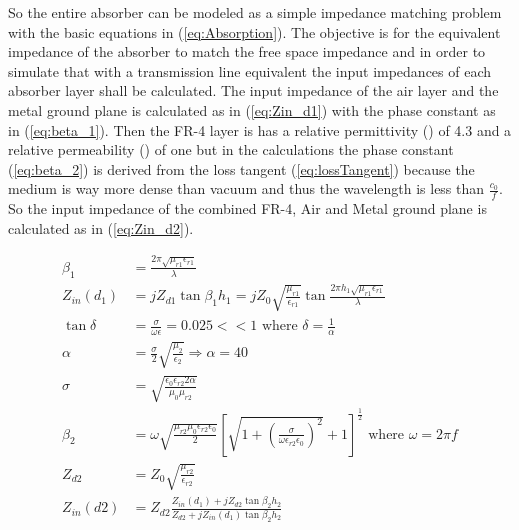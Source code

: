             So the entire absorber can be modeled as a simple impedance matching
            problem with the basic equations in (\ref{eq:Absorption}). The
            objective is for the equivalent impedance of the absorber to match
            the free space impedance and in order to simulate that with a 
            transmission line equivalent the input impedances of each absorber
            layer shall be calculated. The input impedance of the air layer and
            the metal ground plane is calculated as in (\ref{eq:Zin_d1}) with
            the phase constant as in (\ref{eq:beta_1}). Then the FR-4 layer
            is has a relative permittivity (\epsilon) of 4.3 and a relative 
            permeability (\mu) of one but in the calculations the phase
            constant (\ref{eq:beta_2}) is derived from the loss tangent 
            (\ref{eq:lossTangent}) because the medium is way more dense than
            vacuum and thus the wavelength is less than $\frac{c_0}{f}$. So the 
            input impedance of the combined FR-4, Air and Metal ground plane is 
            calculated as in (\ref{eq:Zin_d2}).

            \begin{subequations}
                \label{eq:Zin}
                \begin{align}
                    \beta_1 & = \frac{2\pi\sqrt{\mu_{r1}\epsilon_{r1}}}{\lambda} \label{eq:beta_1} \\
                    Z_{in}(d_1) & = jZ_{d1}\tan{\beta_1h_1} = jZ_0\sqrt{\frac{\mu_{r1}}{\epsilon_{r1}}}
                            \tan{\frac{2\pi h_1\sqrt{\mu_{r1}\epsilon_{r1}}}{\lambda}} \label{eq:Zin_d1} \\
                    \tan{\delta} & = \frac{\sigma}{\omega\epsilon} = 0.025 << 1
                        \textrm{ where } \delta = \frac{1}{\alpha} \label{eq:lossTangent} \\
                    \alpha & = \frac{\sigma}{2}\sqrt{\frac{\mu_2}{\epsilon_2}} \Rightarrow \alpha = 40 \label{eq:alpha} \\
                    \sigma & = \sqrt{\frac{\epsilon_0\epsilon_{r2}2\alpha}{\mu_0\mu_{r2}}} \label{eq:sigma} \\
                    \beta_2 & = \omega\sqrt{\frac{\mu_{r2}\mu_0\epsilon_{r2}\epsilon_0}{2}}
                        \left[
                            \sqrt{1+\left(\frac{\sigma}{\omega\epsilon_{r2}\epsilon_0}\right)^2}+1
                        \right]^\frac{1}{2} \textrm{ where } \omega = 2\pi f \label{eq:beta_2} \\
                    Z_{d2} & = Z_0\sqrt{\frac{\mu_{r2}}{\epsilon_{r2}}} \label{eq:Zd2} \\
                    Z_{in}(d2) & = Z_{d2}\frac{Z_{in}(d_1)+jZ_{d2}\tan{\beta_2h_2}}
                        {Z_{d2}+jZ_{in}(d_1)\tan{\beta_2h_2}} \label{eq:Zin_d2}
                \end{align} 
            \end{subequations}

